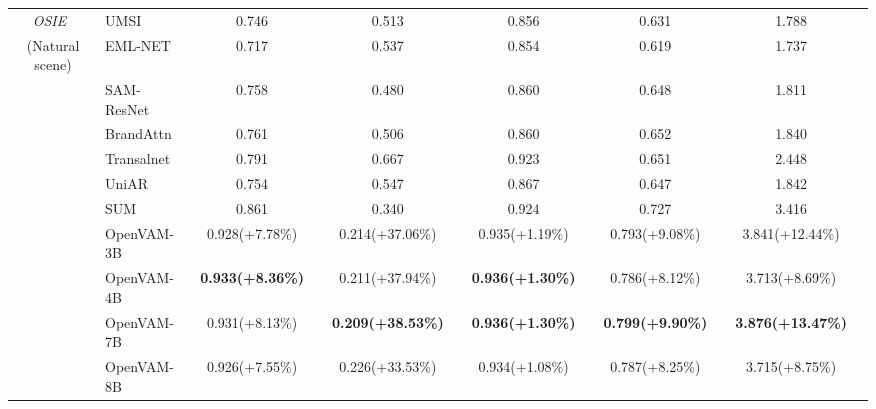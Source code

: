 \begin{table}[t]
{\begin{tabular}{c|lcccccccccc}
    \textit{OSIE}~\cite{xu2014predicting}
    & UMSI~\cite{fosco2020predicting} & 0.746 && 0.513 && 0.856 && 0.631 && 1.788 & \\
    (Natural scene)
    & EML-NET~\cite{jia2020eml} & 0.717 && 0.537 && 0.854 && 0.619 && 1.737 & \\
    & SAM-ResNet~\cite{cornia2018predicting} & 0.758 && 0.480 && 0.860 && 0.648 && 1.811 & \\
    & BrandAttn~\cite{chen2023learning} & 0.761 && 0.506 && 0.860 && 0.652 && 1.840 & \\
    & Transalnet~\cite{jiang2023ueyes} & 0.791 && 0.667 && 0.923 && 0.651 && 2.448 & \\
    & UniAR~\cite{li2024uniar} & 0.754 && 0.547 && 0.867 && 0.647 && 1.842 & \\
    & SUM~\cite{hosseini2025sum} & 0.861 && 0.340 && 0.924 && 0.727 && 3.416 & \\
    \cmidrule{2-12}
    & \cellcolor[HTML]{DADCFF}OpenVAM-3B
    & \cellcolor[HTML]{DADCFF}0.928\scriptsize{(+7.78\%)} && 
      \cellcolor[HTML]{DADCFF}0.214\scriptsize{(+37.06\%)} && 
      \cellcolor[HTML]{DADCFF}0.935\scriptsize{(+1.19\%)} && 
      \cellcolor[HTML]{DADCFF}0.793\scriptsize{(+9.08\%)} && 
      \cellcolor[HTML]{DADCFF}3.841\scriptsize{(+12.44\%)} & \\
    & \cellcolor[HTML]{DADCFF}OpenVAM-4B
    & \cellcolor[HTML]{DADCFF}\textbf{0.933\scriptsize{(+8.36\%)}} && 
      \cellcolor[HTML]{DADCFF}0.211\scriptsize{(+37.94\%)} && 
      \cellcolor[HTML]{DADCFF}\textbf{0.936\scriptsize{(+1.30\%)}} && 
      \cellcolor[HTML]{DADCFF}0.786\scriptsize{(+8.12\%)} && 
      \cellcolor[HTML]{DADCFF}3.713\scriptsize{(+8.69\%)} & \\
    & \cellcolor[HTML]{DADCFF}OpenVAM-7B
    & \cellcolor[HTML]{DADCFF}0.931\scriptsize{(+8.13\%)} && 
      \cellcolor[HTML]{DADCFF}\textbf{0.209\scriptsize{(+38.53\%)}} && 
      \cellcolor[HTML]{DADCFF}\textbf{0.936\scriptsize{(+1.30\%)}} && 
      \cellcolor[HTML]{DADCFF}\textbf{0.799\scriptsize{(+9.90\%)}} && 
      \cellcolor[HTML]{DADCFF}\textbf{3.876\scriptsize{(+13.47\%)}} & \\
    & \cellcolor[HTML]{DADCFF}OpenVAM-8B
    & \cellcolor[HTML]{DADCFF}0.926\scriptsize{(+7.55\%)} && 
      \cellcolor[HTML]{DADCFF}0.226\scriptsize{(+33.53\%)} && 
      \cellcolor[HTML]{DADCFF}0.934\scriptsize{(+1.08\%)} && 
      \cellcolor[HTML]{DADCFF}0.787\scriptsize{(+8.25\%)} && 
      \cellcolor[HTML]{DADCFF}3.715\scriptsize{(+8.75\%)} & \\
    \midrule
    

\end{tabular}}
\end{table}
